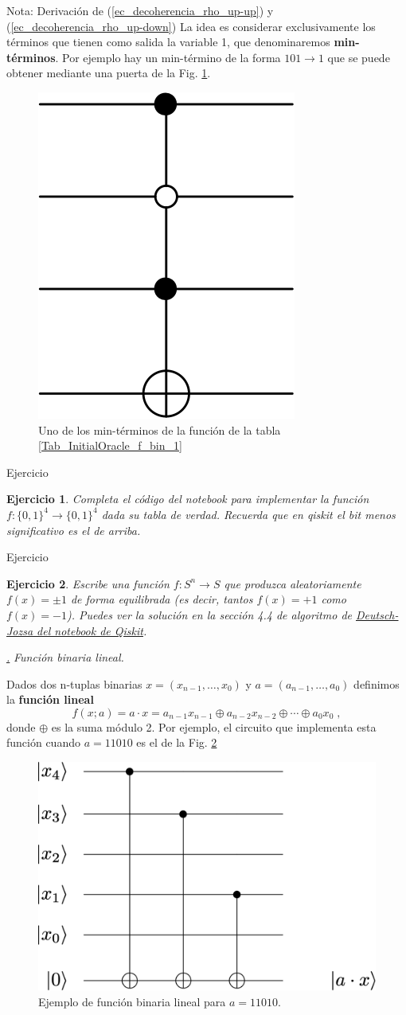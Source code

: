 \documentclass[a4paper,11pt]{book} %
\newtheorem{ejercicio_contador}{Ejercicio}
\newcommand{\Ejercicio}[1]{
		\begin{mybox_gray}{Ejercicio} 
			\begin{ejercicio_contador}
				 #1 
			\end{ejercicio_contador} 
		\end{mybox_gray}
	}
\numberwithin{equation}{chapter}
\def\subsubiContadorIt{\par\addtocounter{subsubsection}{1}\underline{\it\thesubsubsection.}\hskip0.5cm \setcounter{subsubsubsectionIt}{0}}
\newcommand{\SubsubiIt}[1]{
		\subsubiContadorIt \textit{#1}
	}
\newcounter{subsubsubsectionIt}[subsubsection]
\begin{document}
\begin{mybox_blue}{Nota: Derivación de (\ref{ec_decoherencia_rho_up-up}) y  (\ref{ec_decoherencia_rho_up-down})}
La idea es considerar exclusivamente los términos que tienen como salida la variable 1, que denominaremos \textbf{min-términos}. Por ejemplo hay un min-término de la forma $101 \to 1$ que se puede obtener mediante una puerta de la Fig. \ref{Fig_InitialOracle_ctrl5}.
	\begin{figure}[H]
	\centering 
	\includegraphics[width=0.13\linewidth]{Figuras/Fig_InitialOracle_ctrl5}
	\caption{Uno de los min-términos de la función de la tabla \ref{Tab_InitialOracle_f_bin_1}}
	\label{Fig_InitialOracle_ctrl5}
	\end{figure}



	\Ejercicio{Completa el código del notebook para implementar la función $f:\{0,1\}^4\to \{0,1\}^4$ dada su tabla de verdad. 
	Recuerda que en qiskit el bit menos significativo es el de arriba.}



	\Ejercicio{Escribe una función $f:S^n\to S$  que  produzca aleatoriamente $f(x) = \pm 1$ de forma \textit{equilibrada} (es decir, tantos $f(x)= +1$ como $f(x)= -1$).  Puedes ver la solución en la sección 4.4 de algoritmo de \href{https://learn.qiskit.org/course/ch-algorithms/deutsch-jozsa-algorithm}{Deutsch-Jozsa del notebook de Qiskit}.}


			\SubsubiIt{Función binaria lineal.} 

Dados dos n-tuplas binarias $x=(x_{n-1},\ldots,x_0)$ y $a=(a_{n-1},\ldots,a_0)$ definimos la \textbf{función lineal}
\begin{equation}
f(x;a) = a \cdot x = a_{n-1} x_{n-1} \oplus a_{n-2} x_{n-2} \oplus \cdots \oplus a_{0} x_{0}\; ,
\end{equation}
donde  $\oplus$ es la suma módulo 2. Por ejemplo, el circuito que implementa esta función cuando $a=11010$ es el de la Fig.  \ref{Fig_InitialOracle_linear_function}

	\begin{figure}[H]
	\centering 
	\includegraphics[width=0.35\linewidth]{Figuras/Fig_InitialOracle_linear_function}
	\caption{Ejemplo de función binaria lineal para $a=11010$.}
	\label{Fig_InitialOracle_linear_function}
	\end{figure}


\end{mybox_blue}
\end{document}
